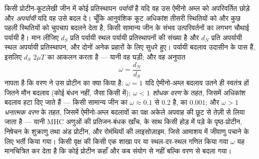 \begin{definition}[dN/dS]\label{def:b3:molecular-evolution:dnds}
किसी प्रोटीन-कूटलेखी जीन में कोई प्रतिस्थापन \emph{पर्यायी} है यदि वह
उस ऐमीनो अम्ल को अपरिवर्तित छोड़े और \emph{अपर्यायी} यदि वह उसे बदल दे।
चूँकि आनुवंशिक कूट अधिकांश तीसरी स्थितियों को और कुछ पहली स्थितियों को
चुपचाप बदलने देता है, किसी सामान्य जीन के संभव उत्परिवर्तनों का लगभग
चौथाई पर्यायी है। मान लीजिए $d_{S}$ प्रति पर्यायी स्थल पर्यायी
प्रतिस्थापनों की संख्या है और $d_{N}$ प्रति अपर्यायी स्थल अपर्यायी
प्रतिस्थापन, और दोनों अनेक प्रहारों के लिए सुधरे हुए। पर्यायी बदलाव
उदासीन के पास हैं, इसलिए $d_{S}$ $2\mu T$ का आकलन करता है --- यानी वह
घड़ी; और वह अनुपात
\[
\omega = \frac{d_{N}}{d_{S}}
\]
नापता है कि वरण ने उस प्रोटीन का क्या किया है: $\omega = 1$ यदि
ऐमीनो-अम्ल बदलाव उतने ही स्वतंत्र हों जितने मौन बदलाव (कोई बंधन नहीं,
जैसा किसी  में); $\omega < 1$ \emph{शोधक वरण} के तहत, जिसमें
अधिकांश बदलाव हटा दिए जाते हैं --- किसी सामान्य जीन का
$\omega \approx 0.1$ से $0.2$ है,  का $0.001$; और
$\omega > 1$ \emph{धनात्मक वरण} के तहत, जिसमें ऐमीनो-अम्ल बदलावों का
पक्ष अकेले अपवाह की छूट से तेज़ी से लिया जाता है --- यानी MHC अणुओं की
प्रतिजन-बंधक खाँच,  के साथ किसी होड़ में पड़े  के
पृष्ठ-प्रोटीन, निषेचन के शुक्राणु तथा अंड प्रोटीन, और रोमंथियों की
लाइसोज़ाइम, जिसे आमाशय में जीवाणु पचाने के लिए भर्ती किया गया।
किसी वृक्ष की किसी एक शाखा पर या स्थल-दर-स्थल गणित किया गया $\omega$
यह मानचित्रित कर देता है कि कोई प्रोटीन कहाँ और कब संयोग से नहीं बल्कि
वरण से बदला गया।
\end{definition}


